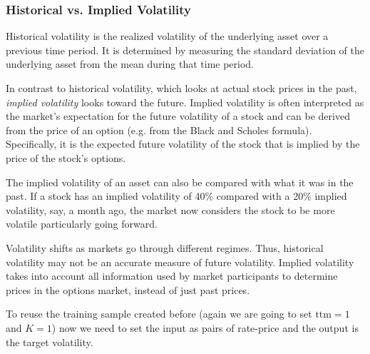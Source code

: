 \begin{attention}
\subsubsection{Historical vs. Implied Volatility}
\label{historical-vs.-implied-volatility}

Historical volatility is the realized volatility of the underlying asset over a previous time period. It is determined by measuring the standard deviation of the underlying asset from the mean during that time period.

In contrast to historical volatility, which looks at actual stock prices in the past, \emph{implied volatility} looks toward the future. Implied volatility is often interpreted as the market's expectation for the future volatility of a stock and can be derived from the price of an option (e.g. from the Black and Scholes formula).
Specifically, it is the expected future volatility of the stock that is implied by the price of the stock's options.

The implied volatility of an asset can also be compared with what it was in the past. If a stock has an implied volatility of 40\% compared with a 20\% implied volatility, say, a month ago, the market now considers the stock to be more volatile particularly going forward.

Volatility shifts as markets go through different regimes. Thus, historical volatility may not be an accurate measure of future volatility. Implied volatility takes into account all information used by market participants to  determine prices in the options market, instead of just past prices.

\end{attention}

To reuse the training sample created before (again we are going to set \(\mathrm{ttm}=1\) and \(K=1\)) now we need to set the input as pairs of rate-price and the output is the target volatility.

